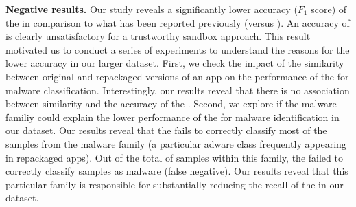 {\bf Negative results.} Our study reveals a significantly lower
accuracy ($F_1$ score) of the \mas in comparison to what has been reported previously (\fscore versus \fscoreSmall). 
An accuracy of \fscore is clearly unsatisfactory for a trustworthy sandbox approach.
This result motivated us to conduct a series of experiments 
to understand the reasons for the lower accuracy in our larger dataset.
First, we check the impact of the similarity between original and repackaged versions of
an app on the performance of the \mas for malware classification. Interestingly, our results reveal that there is no
association between similarity and the accuracy of the \mas . 
Second, we explore if the
malware familiy could explain the lower performance of the \mas for malware identification in 
our dataset. Our results reveal that the \mas fails to correctly classify most of the samples from
the \gps malware family (a particular adware class frequently appearing in repackaged apps).
Out of the total of \appsGps samples within this family, the \mas failed to correctly classify \appsGpsFN samples as malware (false negative).
Our results reveal that this particular family is responsible for substantially reducing the recall of the \mas in our dataset.
  

%


